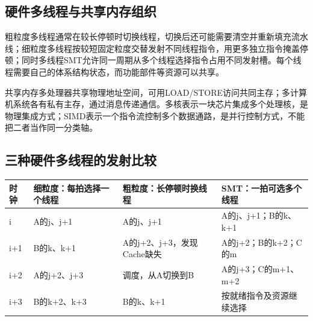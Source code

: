 \subsection{硬件多线程与共享内存组织}\label{CO05-thread-details}

粗粒度多线程通常在较长停顿时切换线程，切换后还可能需要清空并重新填充流水线；细粒度多线程按较短固定粒度交替发射不同线程指令，用更多独立指令掩盖停顿；同时多线程SMT允许同一周期从多个线程选择指令占用不同发射槽。每个线程需要自己的体系结构状态，而功能部件等资源可以共享。

共享内存多处理器共享物理地址空间，可用LOAD/STORE访问共同主存；多计算机系统各有私有主存，通过消息传递通信。多核表示一块芯片集成多个处理核，是物理集成方式；SIMD表示一个指令流控制多个数据通路，是并行控制方式，不能把二者当作同一分类轴。

\subsection{三种硬件多线程的发射比较}\label{CO05-thread-schedule}

\begin{wideblock}\par\medskip\noindent\begin{minipage}{\linewidth}\fontsize{9.3}{12}\selectfont\begin{tabularx}{\linewidth}{@{}YYYY@{}}
\toprule\noalign{}
\begin{minipage}[b]{\linewidth}\raggedright
时钟
\end{minipage} & \begin{minipage}[b]{\linewidth}\raggedright
细粒度：每拍选择一个线程
\end{minipage} & \begin{minipage}[b]{\linewidth}\raggedright
粗粒度：长停顿时换线程
\end{minipage} & \begin{minipage}[b]{\linewidth}\raggedright
SMT：一拍可选多个线程
\end{minipage} \\
\midrule\noalign{}


i & A的j、j+1 & A的j、j+1 & A的j、j+1；B的k、k+1 \\
i+1 & B的k、k+1 & A的j+2、j+3，发现Cache缺失 & A的j+2；B的k+2；C的m \\
i+2 & A的j+2、j+3 & 调度，从A切换到B & A的j+3；C的m+1、m+2 \\
i+3 & B的k+2、k+3 & B的k、k+1 & 按就绪指令及资源继续选择 \\
\bottomrule\end{tabularx}
\end{minipage}\par\medskip\end{wideblock}

